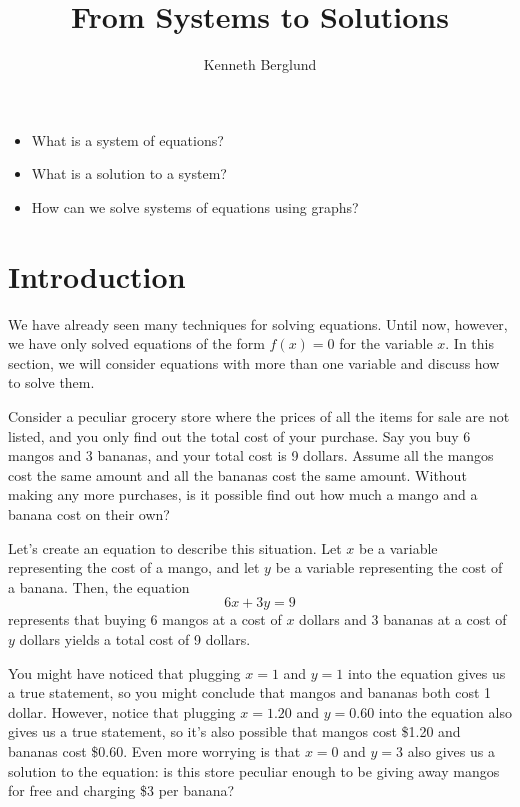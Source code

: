 \documentclass[nooutcomes]{ximera}
\author{Kenneth Berglund}
\title{From Systems to Solutions}
\begin{document}
\begin{abstract}
  
\end{abstract}
\maketitle

\begin{motivatingQuestions}\begin{itemize}
\item What is a system of equations?
\item What is a solution to a system?
\item How can we solve systems of equations using graphs?
\end{itemize}\end{motivatingQuestions}

\section{Introduction}

We have already seen many techniques for solving equations. Until now, however, we have only solved equations of the form $f(x) = 0$ for the variable $x$. In this section, we will consider equations with more than one variable and discuss how to solve them.

Consider a peculiar grocery store where the prices of all the items for sale are not listed, and you only find out the total cost of your purchase. Say you buy 6 mangos and 3 bananas, and your total cost is 9 dollars. Assume all the mangos cost the same amount and all the bananas cost the same amount. Without making any more purchases, is it possible find out how much a mango and a banana cost on their own? 

Let's create an equation to describe this situation. Let $x$ be a variable representing the cost of a mango, and let $y$ be a variable representing the cost of a banana. Then, the equation
$$
6x + 3y = 9
$$
represents that buying 6 mangos at a cost of $x$ dollars and 3 bananas at a cost of $y$ dollars yields a total cost of 9 dollars. 

You might have noticed that plugging $x = 1$ and $y = 1$ into the equation gives us a true statement, so you might conclude that mangos and bananas both cost 1 dollar. However, notice that plugging $x = 1.20$ and $y = 0.60$ into the equation also gives us a true statement, so it's also possible that mangos cost \$1.20 and bananas cost \$0.60. Even more worrying is that $x = 0$ and $y = 3$ also gives us a solution to the equation: is this store peculiar enough to be giving away mangos for free and charging \$3 per banana?
\end{document}
